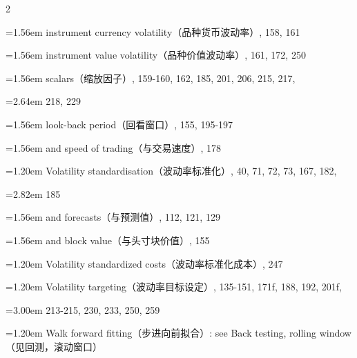 {\begin{multicols}{2}
\par \noindent\hangindent=1.56em\hspace*{0.36em} instrument currency volatility（品种货币波动率）, 158, 161
\par \noindent\hangindent=1.56em\hspace*{0.36em} instrument value volatility（品种价值波动率）, 161, 172, 250
\par \noindent\hangindent=1.56em\hspace*{0.36em} scalars（缩放因子）, 159-160, 162, 185, 201, 206, 215, 217,
\par \noindent\hangindent=2.64em\hspace*{1.44em} 218, 229
\par \noindent\hangindent=1.56em\hspace*{0.36em} look-back period（回看窗口）, 155, 195-197
\par \noindent\hangindent=1.56em\hspace*{0.36em} and speed of trading（与交易速度）, 178
\par \noindent\hangindent=1.20em\hspace*{0.00em} Volatility standardisation（波动率标准化）, 40, 71, 72, 73, 167, 182,
\par \noindent\hangindent=2.82em\hspace*{1.62em} 185
\par \noindent\hangindent=1.56em\hspace*{0.36em} and forecasts（与预测值）, 112, 121, 129
\par \noindent\hangindent=1.56em\hspace*{0.36em} and block value（与头寸块价值）, 155
\par \noindent\hangindent=1.20em\hspace*{0.00em} Volatility standardized costs（波动率标准化成本）, 247
\par \noindent\hangindent=1.20em\hspace*{0.00em} Volatility targeting（波动率目标设定）, 135-151, 171f, 188, 192, 201f,
\par \noindent\hangindent=3.00em\hspace*{1.80em} 213-215, 230, 233, 250, 259
\par \noindent\hangindent=1.20em\hspace*{0.00em} Walk forward fitting（步进向前拟合）: see Back testing, rolling window（见回测，滚动窗口）

\end{multicols}}
